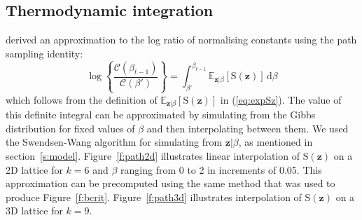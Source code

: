 \documentclass[nojss,shortnames]{jss}\usepackage[]{graphicx}\usepackage[]{color}
\begin{document}
\subsection{Thermodynamic integration}
\citet{Gelman1998} derived an approximation to the log ratio of normalising constants using the path sampling identity:
\begin{equation}
\label{eq:path}
\log\left\{\frac{\mathcal{C}(\beta_{t-1})}{\mathcal{C}(\beta')}\right\} = \int_{\beta'}^{\beta_{t-1}} \mathbb{E}_{\mathbf{z} | \beta}[\mathrm{S}(\mathbf{z})] \, \mathrm{d}\beta
\end{equation}
which follows from the definition of $\mathbb{E}_{\mathbf{z} | \beta}[\mathrm{S}(\mathbf{z})]$ in (\ref{eq:expSz}). The value of this definite integral can be approximated by simulating from the Gibbs distribution for fixed values of $\beta$ and then interpolating between them. We used the Swendsen-Wang algorithm for simulating from $\mathbf{z}|\beta$, as mentioned in section~\ref{s:model}. Figure~\ref{f:path2d} illustrates linear interpolation of $\mathrm{S}(\mathbf{z})$ on a 2D lattice for $k=6$ and $\beta$ ranging from 0 to 2 in increments of 0.05. This approximation can be precomputed using the same method that was used to produce Figure~\ref{f:bcrit}. Figure~\ref{f:path3d} illustrates interpolation of  $\mathrm{S}(\mathbf{z})$ on a 3D lattice for $k=9$.
\end{document}
